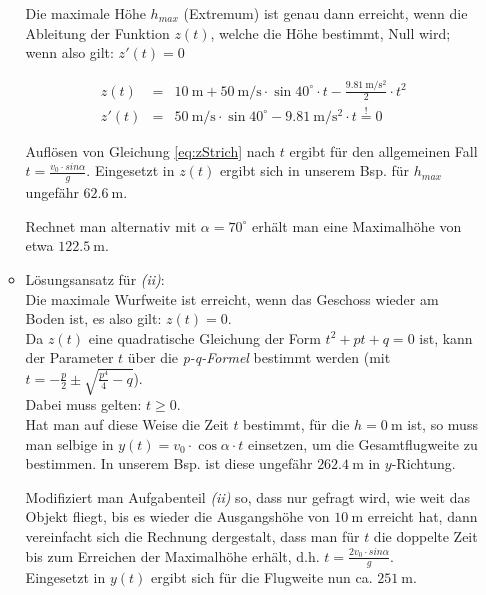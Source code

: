 \documentclass[a4paper, 12pt, onecolumn]{scrartcl}
\begin{document}
\begin{itemize}
\begin{itemize}
    Die maximale Höhe $h_{max}$ (Extremum) ist genau dann erreicht, wenn die Ableitung 
    der Funktion $z (t)$, welche die Höhe bestimmt, Null wird; wenn also gilt: $z' (t) = 0$

  \begin{eqnarray}
    z (t)  &=& \SI{10}{\meter} + \SI{50}{\meter\per\second} \cdot \sin 40^\circ \cdot t - 
        \frac{\SI{9.81}{\meter\per\square\second}}{2} \cdot t^2 \\
    z' (t) &=& \SI{50}{\meter\per\second} \cdot \sin 40^\circ - \SI{9.81}{\meter\per\square\second} \cdot t \stackrel{!}= 0
    \label{eq:zStrich}
  \end{eqnarray}

    Auflösen von Gleichung \ref{eq:zStrich} nach $t$ ergibt für den allgemeinen Fall 
    $t = \frac{v_0 \cdot sin \alpha}{g}$.
    Eingesetzt in $z (t)$ ergibt sich in unserem Bsp. für $h_{max}$ ungefähr $\SI{62.6}{\meter}$.
    
    Rechnet man alternativ mit $\alpha = 70^{\circ}$ erhält man eine Maximalhöhe von etwa $\SI{122.5}{\meter}$.
    
    
    \item Lösungsansatz für \emph{(ii)}:\\
    Die maximale Wurfweite ist erreicht, wenn das Geschoss wieder am Boden ist, 
    es also gilt: $z (t) = 0$.\\
    Da $z (t)$ eine quadratische Gleichung der Form $t^2 + p t + q = 0$ ist,
    kann der Parameter $t$ über die \emph{p-q-Formel} bestimmt werden
    (mit $t = -\frac{p}{2} \pm \sqrt{\frac{p^4}{4} - q}$).\\
    Dabei muss gelten: $t \ge 0$.\\
    Hat man auf diese Weise die Zeit $t$ bestimmt, für die $h = \SI{0}{\meter}$ ist, so muss
    man selbige in $y (t) = v_0 \cdot \cos \alpha \cdot t$ einsetzen, um die Gesamtflugweite
    zu bestimmen. In unserem Bsp. ist diese ungefähr $\SI{262.4}{\meter}$ in $y$-Richtung.
    
    Modifiziert man Aufgabenteil \emph{(ii)} so, dass nur gefragt wird, wie weit das Objekt 
    fliegt, bis es wieder die Ausgangshöhe von $\SI{10}{\meter}$ erreicht hat, dann
    vereinfacht sich die Rechnung dergestalt, dass man für $t$ die doppelte Zeit bis
    zum Erreichen der Maximalhöhe erhält, d.h. $t = \frac{2 v_0 \cdot sin \alpha}{g}$. \\
    Eingesetzt in $y (t)$ ergibt sich für die Flugweite nun ca. $\SI{251}{\meter}$.
    

\end{itemize}
\end{itemize}
\end{document}
